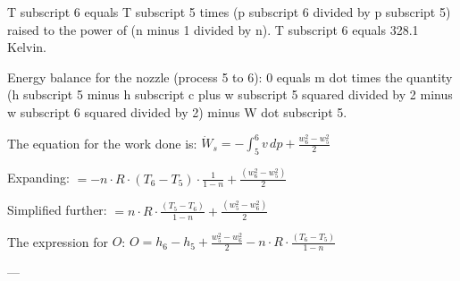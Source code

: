 T subscript 6 equals T subscript 5 times (p subscript 6 divided by p subscript 5) raised to the power of (n minus 1 divided by n).  
T subscript 6 equals 328.1 Kelvin.  

Energy balance for the nozzle (process 5 to 6):  
0 equals m dot times the quantity (h subscript 5 minus h subscript c plus w subscript 5 squared divided by 2 minus w subscript 6 squared divided by 2) minus W dot subscript 5.

The equation for the work done is:  
\( \dot{W}_s = - \int_5^6 v \, dp + \frac{w_6^2 - w_5^2}{2} \)  

Expanding:  
\( = - n \cdot R \cdot (T_6 - T_5) \cdot \frac{1}{1-n} + \frac{(w_6^2 - w_5^2)}{2} \)  

Simplified further:  
\( = n \cdot R \cdot \frac{(T_5 - T_6)}{1-n} + \frac{(w_5^2 - w_6^2)}{2} \)  

The expression for \( O \):  
\( O = h_6 - h_5 + \frac{w_5^2 - w_6^2}{2} - n \cdot R \cdot \frac{(T_6 - T_5)}{1-n} \)  

---
